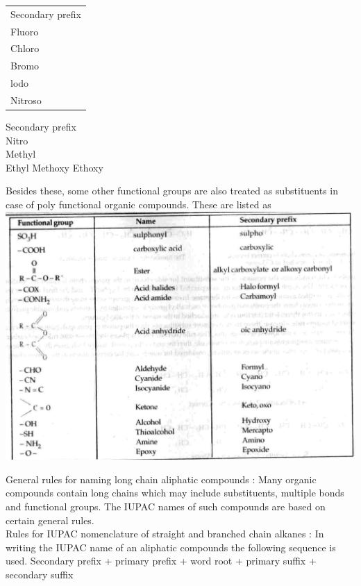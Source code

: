 \documentclass[10pt]{article}
\begin{document}
\begin{center}
\begin{tabular}{l}
Secondary prefix \\
Fluoro \\
Chloro \\
\hline
Bromo \\
lodo \\
\hline
Nitroso \\
\hline
\end{tabular}
\end{center}

Secondary prefix\\
Nitro\\
Methyl\\
Ethyl Methoxy Ethoxy

Besides these, some other functional groups are also treated as substituents in case of poly functional organic compounds. These are listed as\\
\includegraphics[max width=\textwidth, center]{2025_01_28_8470952b98110cec3aabg-019(2)}

General rules for naming long chain aliphatic compounds : Many organic compounds contain long chains which may include substituents, multiple bonds and functional groups. The IUPAC names of such compounds are based on certain general rules.\\
Rules for IUPAC nomenclature of straight and branched chain alkanes : In writing the IUPAC name of an aliphatic compounds the following sequence is used. Secondary prefix + primary prefix + word root + primary suffix + secondary suffix
\end{document}
